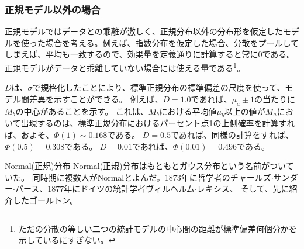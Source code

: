 \subsubsection{正規モデル以外の場合}
正規モデルではデータとの乖離が激しく、正規分布以外の分布形を仮定したモデルを使った場合を考える。例えば、指数分布を仮定した場合、分散をプールしてしまえば、平均も一致するので、効果量を定義通りに計算すると常に$0$である。正規モデルがデータと乖離していない場合には使える量である\footnote{ただの分散の等しい二つの統計モデルの中心間の距離が標準偏差何個分かを示しているにすぎない。}。


$D$は、$\sigma$で規格化したことにより、標準正規分布の標準偏差の尺度を使って、モデル間差異を示すことができる。
例えば、$D=1.0$であれば、$\mu_a\pm 1$の当たりに$M_b$の中心があることを示す。
これは、$M_b$における平均値$\mu_b$以上の値が$M_a$において出現するのは、標準正規分布におけるパーセント点1の上側確率を計算すれば、およそ、$\varPhi(1)\sim0.168$である。
$D=0.5$であれば、同様の計算をすれば、$\varPhi(0.5)=0.308$である。
$D=0.01$であれば、$\varPhi(0.01)=0.496$である。
\fi


\begin{SMbox}{Normal(正規)分布}
 Normal(正規)分布はもともとガウス分布という名前がついていた。
 同時期に複数人がNormalとよんだ。1873年に哲学者のチャールズ$\cdot$サンダー$\cdot$パース、$1877$年にドイツの統計学者ヴィルヘルム$\cdot$レキシス、
 そして、先に紹介したゴールトン。

\end{SMbox}


